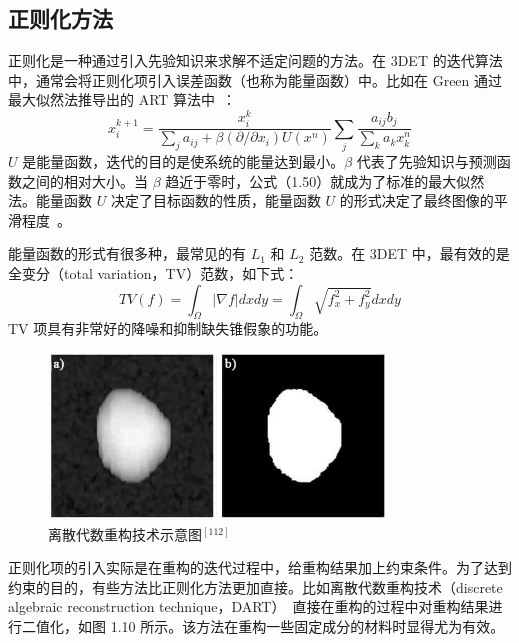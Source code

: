 \subsection{正则化方法}
正则化是一种通过引入先验知识来求解不适定问题的方法。在 3DET 的迭代算法中，通常会将正则化项引入误差函数（也称为能量函数）中。比如在 Green 通过最大似然法推导出的 ART 算法中~\cite{Green1990}：
\begin{equation}
x_i^{k+1} = \frac{x_i^k}{\sum_ja_{ij}+\beta(\partial/\partial x_i)U(x^n)}\sum_j \frac{a_{ij}b_j}{\sum_k a_k x_k^n}
\end{equation}
 $U$ 是能量函数，迭代的目的是使系统的能量达到最小。$\beta$ 代表了先验知识与预测函数之间的相对大小。当 $\beta$ 趋近于零时，公式（1.50）就成为了标准的最大似然法。能量函数 $U$ 决定了目标函数的性质，能量函数 $U$ 的形式决定了最终图像的平滑程度~\cite{Persson2001}。

能量函数的形式有很多种，最常见的有 $L_1$ 和 $L_2$ 范数。在 3DET 中，最有效的是全变分（total variation，TV）范数，如下式：
\begin{equation}
\textit{TV}(f) = \int_{\Omega}  |\nabla f|dxdy= \int_{\Omega}\sqrt{f_x^2+f_y^2}dxdy
\end{equation}
TV 项具有非常好的降噪和抑制缺失锥假象的功能。
\begin{figure}[htbp]
	\vspace{\baselineskip}
	\centering
	\includegraphics[width=0.8\textwidth]{../1.20/1201}
	\caption{离散代数重构技术示意图$^{[112]}$}\label{fig:120}
	\song{}
\end{figure}

正则化项的引入实际是在重构的迭代过程中，给重构结果加上约束条件。为了达到约束的目的，有些方法比正则化方法更加直接。比如离散代数重构技术（discrete algebraic reconstruction technique，DART）~\cite{Batenburg2009,Bals2007,Biermans2010,Bals2009,Zurner2009,Zhuge2017}直接在重构的过程中对重构结果进行二值化，如图 1.10 所示。该方法在重构一些固定成分的材料时显得尤为有效。


